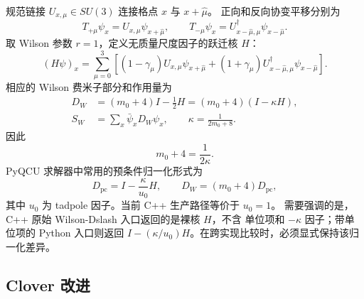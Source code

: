\documentclass[UTF8,a4paper,11pt,fontset=none]{ctexart}
\numberwithin{equation}{section}
\numberwithin{figure}{section}
\numberwithin{table}{section}
\begin{document}
规范链接 \(U_{x,\mu}\in SU(3)\) 连接格点 \(x\) 与 \(x+\hat\mu\)。
正向和反向协变平移分别为
\begin{equation}
 T_{+\mu}\psi_x=U_{x,\mu}\psi_{x+\hat\mu},\qquad
 T_{-\mu}\psi_x=U^\dagger_{x-\hat\mu,\mu}\psi_{x-\hat\mu}.
\label{eq:covariant-shift}
\end{equation}
取 Wilson 参数 \(r=1\)，定义无质量尺度因子的跃迁核 \(H\)：
\begin{equation}
 (H\psi)_x=
 \sum_{\mu=0}^{3}\left[
 (1-\gamma_\mu)U_{x,\mu}\psi_{x+\hat\mu}
 +(1+\gamma_\mu)U^\dagger_{x-\hat\mu,\mu}\psi_{x-\hat\mu}
 \right].
\label{eq:hopping-kernel}
\end{equation}
相应的 Wilson 费米子部分和作用量为
\begin{align}
 D_W&=(m_0+4)I-\frac{1}{2}H
 =(m_0+4)\left(I-\kappa H\right),
\label{eq:wilson-operator}\\
 S_W&=\sum_x\bar\psi_xD_W\psi_x,
\qquad
 \kappa=\frac{1}{2m_0+8}.
\label{eq:wilson-action}
\end{align}
因此
\begin{equation}
 m_0+4=\frac{1}{2\kappa}.
\label{eq:kappa-identity}
\end{equation}
PyQCU 求解器中常用的预条件归一化形式为
\begin{equation}
 D_{\mathrm{pc}}=I-\frac{\kappa}{u_0}H,
\qquad
 D_W=(m_0+4)D_{\mathrm{pc}},
\label{eq:wilson-pc}
\end{equation}
其中 \(u_0\) 为 tadpole 因子。当前 C++ 生产路径等价于 \(u_0=1\)。
需要强调的是，C++ 原始 Wilson-Dslash 入口返回的是裸核 \(H\)，不含
单位项和 \(-\kappa\) 因子；带单位项的 Python 入口则返回
\(I-(\kappa/u_0)H\)。在跨实现比较时，必须显式保持该归一化差异。

\subsection{Clover 改进}
\end{document}
